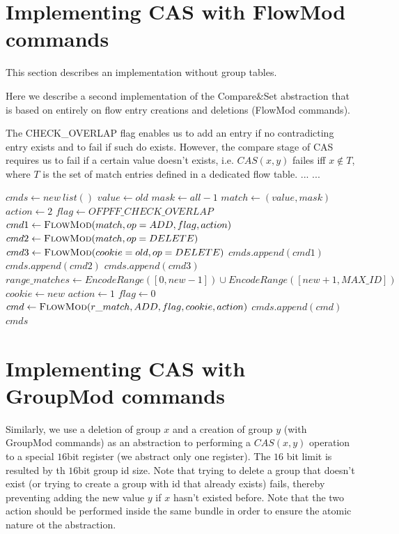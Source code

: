 \documentclass[conference]{sigcomm-alternate}
\newcommand{\concat}[0]{\oplus}
\newcommand{\cas}{CAS\xspace}
\begin{document}
\begin{appendix}

\section{Implementing CAS with FlowMod commands}\label{sec:without-groups}
This section describes an implementation without group tables.

Here we describe a second implementation of the Compare\&Set abstraction that is based on entirely on flow entry creations and deletions (FlowMod commands). 

The CHECK\_OVERLAP flag enables us to add an entry if no contradicting entry exists and to fail if such do exists. However, the compare stage of \cas requires us to fail if a certain value doesn't exists, i.e. $\cas(x,y)$ failes iff $x \notin T$, where $T$ is the set of match entries defined in a dedicated flow table.
...
...


\begin{algorithm}[H]
    \caption{$\textit{CAS}(old,new)$}
    \label{alg:cas2}
    \begin{algorithmic}[1]
			\State $cmds \gets new\ list()$
    		\State $value \gets  old$
    		\State $mask \gets  all-1$
    		\State $match \gets (value,mask)$
    		\State $action \gets 2$
    		\State $flag \gets OFPFF\_CHECK\_OVERLAP$
    		\State $cmd1\gets \textsc{FlowMod}(match, op = ADD, flag, action) $
    		\State $cmd2\gets \textsc{FlowMod}(match, op = DELETE) $
    		\State $cmd3\gets \textsc{FlowMod}(cookie = old, op = DELETE) $
    		\State $cmds.append(cmd1)$
    		\State $cmds.append(cmd2)$
    		\State $cmds.append(cmd3)$
    		\State $range\_matches \gets EncodeRange([0,new-1])\cup EncodeRange([new+1,MAX\_ID])$
    		    		\State $cookie \gets new$
    		    		\State $action \gets 1$
    		    		\State $flag \gets 0$
    		    		\State $cmd\gets \textsc{FlowMod}(r\_match, ADD, flag, cookie, action) $
    		    		\State $cmds.append(cmd)$
    		\EndFor
			\Return $cmds$
    \end{algorithmic}
\end{algorithm}



\section{Implementing CAS with GroupMod commands}\label{sec:with-groups}
Similarly, we use a deletion of group $x$ and a creation of group $y$ (with GroupMod commands) as an
abstraction to performing a $CAS(x,y)$ operation to a special $16$bit register (we abstract only one register). The $16$ bit limit is resulted by th $16$bit group id size. 
Note that trying to delete a group that doesn't exist (or trying to create a group with id that already exists) fails, thereby preventing adding the new value $y$ if $x$ hasn't existed before. Note that the two action should be performed inside the same bundle in order to ensure the atomic nature ot the abstraction.


\end{appendix}
\end{document}
